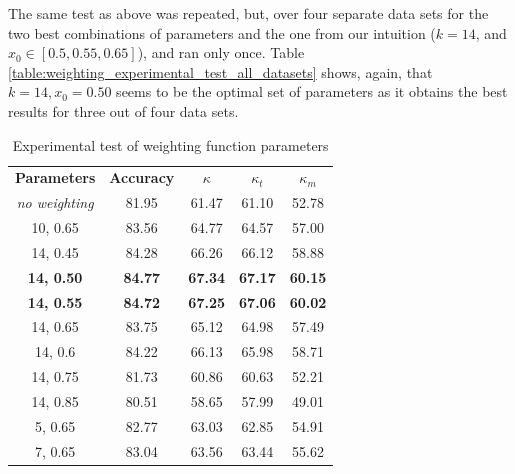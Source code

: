 The same test as above was repeated, but, over four separate data sets for the two best combinations of parameters and the one from our intuition ($k=14$, and $x_0 \in [0.5, 0.55, 0.65]$), and ran only once. Table \ref{table:weighting_experimental_test_all_datasets} shows, again, that $k=14, x_0=0.50$ seems to be the optimal set of parameters as it obtains the best results for three out of four data sets.

\begin{table}[]
\caption{\label{table:weighting_experimental_test}Experimental test of weighting function parameters}
\centering
\begin{tabular}{|c|c|c|c|c|}
\hline
\textbf{Parameters} & \textbf{Accuracy} & \textbf{$\kappa$} & \textbf{$\kappa_t$} & \textbf{$\kappa_m$} \\ \hhline{=====}
\textit{no weighting}&81.95&61.47&61.10&52.78 \\ \hline
10, 0.65&83.56&64.77&64.57&57.00 \\ \hline
14, 0.45&84.28&66.26&66.12&58.88 \\ \hline
\textbf{14, 0.50}&\textbf{84.77}&\textbf{67.34}&\textbf{67.17}&\textbf{60.15} \\ \hline
\textbf{14, 0.55}&\textbf{84.72}&\textbf{67.25}&\textbf{67.06}&\textbf{60.02} \\ \hline
14, 0.65&83.75&65.12&64.98&57.49 \\ \hline
14, 0.6&84.22&66.13&65.98&58.71 \\ \hline
14, 0.75&81.73&60.86&60.63&52.21 \\ \hline
14, 0.85&80.51&58.65&57.99&49.01 \\ \hline
5, 0.65&82.77&63.03&62.85&54.91 \\ \hline
7, 0.65&83.04&63.56&63.44&55.62 \\ \hline
\end{tabular}
\end{table}

